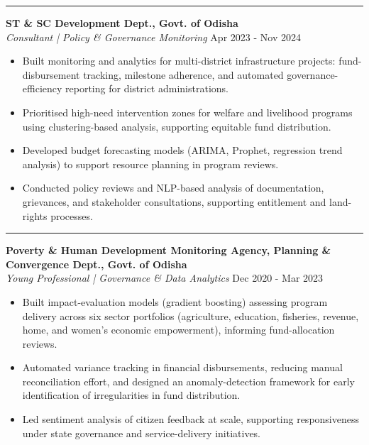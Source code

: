 \documentclass[a4paper,10pt]{article}
\begin{document}
\vspace{1pt}

\noindent\rule{\textwidth}{0.15pt}
{\large\textbf{ST \& SC Development Dept., Govt. of Odisha}} \\
\textit{Consultant | Policy \& Governance Monitoring} \hfill {\datefont\small Apr 2023 - Nov 2024}

\begin{itemize}
\item Built monitoring and analytics for multi-district infrastructure projects: fund-disbursement tracking, milestone adherence, and automated governance-efficiency reporting for district administrations.
\item Prioritised high-need intervention zones for welfare and livelihood programs using clustering-based analysis, supporting equitable fund distribution.
\item Developed budget forecasting models (ARIMA, Prophet, regression trend analysis) to support resource planning in program reviews.
\item Conducted policy reviews and NLP-based analysis of documentation, grievances, and stakeholder consultations, supporting entitlement and land-rights processes.
\end{itemize}

\vspace{1pt}

\noindent\rule{\textwidth}{0.15pt}
{\large\textbf{Poverty \& Human Development Monitoring Agency, Planning \& Convergence Dept., Govt. of Odisha}} \\
\textit{Young Professional | Governance \& Data Analytics} \hfill {\datefont\small Dec 2020 - Mar 2023}

\begin{itemize}
\item Built impact-evaluation models (gradient boosting) assessing program delivery across six sector portfolios (agriculture, education, fisheries, revenue, home, and women's economic empowerment), informing fund-allocation reviews.
\item Automated variance tracking in financial disbursements, reducing manual reconciliation effort, and designed an anomaly-detection framework for early identification of irregularities in fund distribution.
\item Led sentiment analysis of citizen feedback at scale, supporting responsiveness under state governance and service-delivery initiatives.
\end{itemize}
\end{document}
